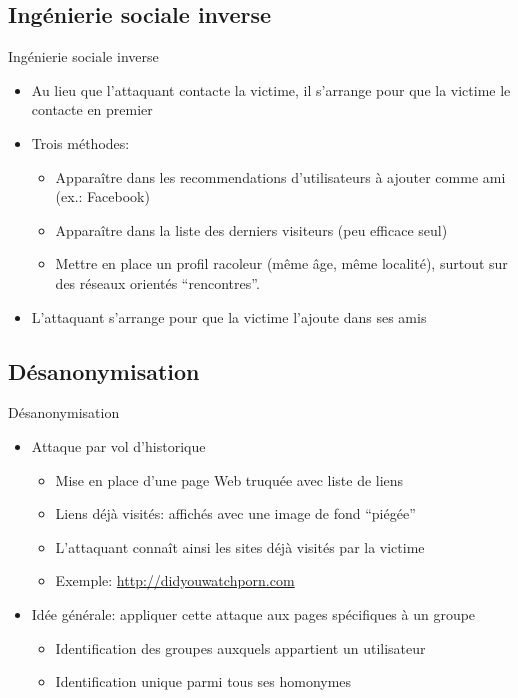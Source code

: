 \subsection{Ingénierie sociale inverse}
\begin{frame}{Ingénierie sociale inverse}
    \begin{itemize}
        \item Au lieu que l'attaquant contacte la victime, il s'arrange pour
            que la victime le contacte en premier
        \item Trois méthodes:
            \begin{itemize}
                \item Apparaître dans les recommendations d'utilisateurs à
                    ajouter comme ami (ex.: Facebook)
                \item Apparaître dans la liste des derniers visiteurs (peu
                    efficace seul)
                \item Mettre en place un profil racoleur (même âge, même
                    localité), surtout sur des réseaux orientés ``rencontres''.
            \end{itemize}
        \item L'attaquant s'arrange pour que la victime l'ajoute dans ses amis
    \end{itemize}
\end{frame}


\subsection{Désanonymisation}
\begin{frame}{Désanonymisation}
    \begin{itemize}
        \item Attaque par vol d'historique
            \begin{itemize}
                \item Mise en place d'une page Web truquée avec liste de liens
                \item Liens déjà visités: affichés avec une image de fond
                    ``piégée''
                \item L'attaquant connaît ainsi les sites déjà visités par la
                    victime  \pause
                \item Exemple: \url{http://didyouwatchporn.com}
            \end{itemize} \pause
        \item Idée générale: appliquer cette attaque aux pages spécifiques à un
            groupe
            \begin{itemize}
                \item Identification des groupes auxquels appartient un
                    utilisateur
                \item Identification unique parmi tous ses homonymes
            \end{itemize}
    \end{itemize}
\end{frame}

